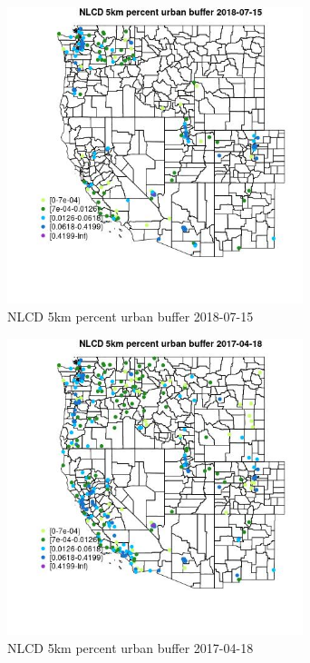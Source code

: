 \begin{figure} 
\centering  
\includegraphics[width=0.77\textwidth]{Code_Outputs/Report_ML_input_PM25_Step4_part_e_de_duplicated_aves_compiled_2019-05-20wNAs_MapObsNLCD_5km_percent_urban_buffer2018-07-15.jpg} 
\caption{\label{fig:Report_ML_input_PM25_Step4_part_e_de_duplicated_aves_compiled_2019-05-20wNAsMapObsNLCD_5km_percent_urban_buffer2018-07-15}NLCD 5km percent urban buffer 2018-07-15} 
\end{figure} 
 

\begin{figure} 
\centering  
\includegraphics[width=0.77\textwidth]{Code_Outputs/Report_ML_input_PM25_Step4_part_e_de_duplicated_aves_compiled_2019-05-20wNAs_MapObsNLCD_5km_percent_urban_buffer2017-04-18.jpg} 
\caption{\label{fig:Report_ML_input_PM25_Step4_part_e_de_duplicated_aves_compiled_2019-05-20wNAsMapObsNLCD_5km_percent_urban_buffer2017-04-18}NLCD 5km percent urban buffer 2017-04-18} 
\end{figure} 
 

